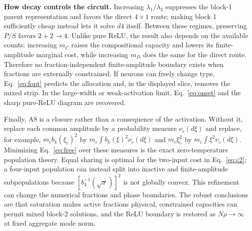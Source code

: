 \documentclass[10pt]{article}
\begin{document}
\textbf{How decay controls the circuit.}
Increasing $\lambda_1/\lambda_2$ suppresses the block-1 parent representation and favors the
direct $4\times1$ route; making block 1 sufficiently cheap instead lets it solve $d4$ itself.
Between these regimes, preserving $P/S$ favors $2+2\to4$.  Unlike pure ReLU, the result also
depends on the available counts: increasing $m_C$ raises the compositional capacity and
lowers its finite-amplitude marginal cost, while increasing $m_D$ does the same for the direct
route.  Therefore no fraction-independent finite-amplitude boundary exists when fractions are
externally constrained.  If neurons can freely change type, Eq.~\eqref{eq:fopt} predicts the
allocation and, in the displayed slice, removes the mixed strip.  In the large-width or
weak-activation limit, Eq.~\eqref{eq:onset} and the sharp pure-ReLU diagram are recovered.

Finally, A8 is a closure rather than a consequence of the activation.  Without it, replace
each common amplitude by a probability measure $\nu_c(d\xi)$ and replace, for example,
$m_cb_k(\xi_c)^2$ by $m_c\int b_k(\xi)^2\nu_c(d\xi)$ and
$m_c\xi_c^2$ by $m_c\int\xi^2\nu_c(d\xi)$.  Minimizing Eq.~\eqref{eq:free} over these
measures is the exact zero-temperature population theory.  Equal sharing is optimal for the
two-input cost in Eq.~\eqref{eq:c2}; a four-input population can instead split into inactive
and finite-amplitude subpopulations because $[b_4^{-1}(\sqrt{x})]^2$ is not globally convex.
This refinement can change the numerical fractions and phase boundaries.  The robust
conclusions are that saturation makes active fractions physical, constrained capacities can
permit mixed block-2 solutions, and the ReLU boundary is restored as $N\rho\to\infty$ at fixed
aggregate mode norm.
\end{document}

